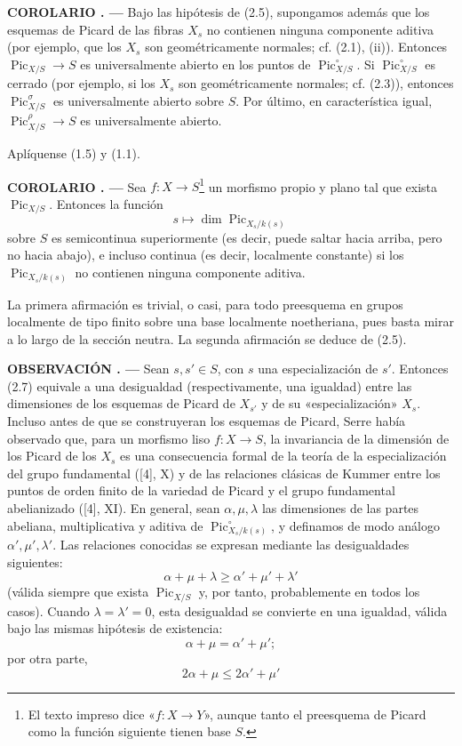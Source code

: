 \documentclass[11pt,twoside,openany]{book}
\numberwithin{equation}{section}
\newcommand{\src}[1]{%
  \phantomsection\hypertarget{src:#1}{}%
  \marginpar{\raggedleft\footnotesize\sffamily #1}%
}
\theoremstyle{plain}
\theoremstyle{definition}
\theoremstyle{remark}
\newcommand{\result}[2]{%
  \par\medskip\noindent\textbf{#1%
  \if\relax\detokenize{#2}\relax\else\space#2\fi. ---}\enspace
}
\newcommand{\FgaUnitKey}{frontmatter}
\renewcommand{\src}[1]{%
  \phantomsection\hypertarget{src:\FgaUnitKey:#1}{}%
  \marginpar{\raggedleft\footnotesize\sffamily #1}%
}
\theoremstyle{plain}
\theoremstyle{definition}
\theoremstyle{remark}
\begin{document}
\result{COROLARIO}{} Bajo las hipótesis de (2.5), supongamos además que los
esquemas de Picard de las fibras $X_s$ no contienen ninguna componente aditiva
(por ejemplo, que los $X_s$ son geométricamente normales; cf. (2.1), (ii)).
Entonces $\operatorname{Pic}_{X/S}\longrightarrow S$ es universalmente abierto
en los puntos de $\operatorname{Pic}_{X/S}^\circ$. Si
$\operatorname{Pic}_{X/S}^\circ$ es cerrado (por ejemplo, si los $X_s$ son
geométricamente normales; cf. (2.3)), entonces
$\operatorname{Pic}_{X/S}^\sigma$ es universalmente abierto sobre $S$. Por
último, en característica igual,
$\operatorname{Pic}_{X/S}^\rho\longrightarrow S$ es universalmente abierto.

Aplíquense (1.5) y (1.1).

\src{234}
\result{COROLARIO}{2.7} Sea $f:X\longrightarrow S$\footnote{El texto impreso
dice «$f:X\longrightarrow Y$», aunque tanto el preesquema de Picard como la
función siguiente tienen base $S$.} un morfismo propio y plano tal que exista
$\operatorname{Pic}_{X/S}$. Entonces la función
\[
s\longmapsto\dim\operatorname{Pic}_{X_s/k(s)}
\]
sobre $S$ es semicontinua superiormente (es decir, puede saltar hacia arriba,
pero no hacia abajo), e incluso continua (es decir, localmente constante) si
los $\operatorname{Pic}_{X_s/k(s)}$ no contienen ninguna componente aditiva.

La primera afirmación es trivial, o casi, para todo preesquema en grupos
localmente de tipo finito sobre una base localmente noetheriana, pues basta
mirar a lo largo de la sección neutra. La segunda afirmación se deduce de
(2.5).

\result{OBSERVACIÓN}{2.8} Sean $s,s'\in S$, con $s$ una especialización de
$s'$. Entonces (2.7) equivale a una desigualdad (respectivamente, una igualdad)
entre las dimensiones de los esquemas de Picard de $X_{s'}$ y de su
«especialización» $X_s$. Incluso antes de que se construyeran los esquemas de
Picard, Serre había observado que, para un morfismo liso
$f:X\longrightarrow S$, la invariancia de la dimensión de los Picard de los
$X_s$ es una consecuencia formal de la teoría de la especialización del grupo
fundamental ([4], X) y de las relaciones clásicas de Kummer entre los puntos de
orden finito de la variedad de Picard y el grupo fundamental abelianizado
([4], XI). En general, sean $\alpha,\mu,\lambda$ las dimensiones de las partes
abeliana, multiplicativa y aditiva de
$\operatorname{Pic}_{X_s/k(s)}^\circ$, y definamos de modo análogo
$\alpha',\mu',\lambda'$. Las relaciones conocidas se expresan mediante las
desigualdades siguientes:
\[
\tag{*}\alpha+\mu+\lambda\geq\alpha'+\mu'+\lambda'
\]
(válida siempre que exista $\operatorname{Pic}_{X/S}$ y, por tanto,
probablemente en todos los casos). Cuando $\lambda=\lambda'=0$, esta
desigualdad se convierte en una igualdad, válida bajo las mismas hipótesis de
existencia:
\[
\alpha+\mu=\alpha'+\mu';
\]
por otra parte,
\[
\tag{**}2\alpha+\mu\leq2\alpha'+\mu'
\]
\end{document}
